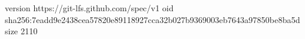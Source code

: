 version https://git-lfs.github.com/spec/v1
oid sha256:7eadd9e2438cea57820e89118927cca32b027b9369003eb7643a97850be8ba5d
size 2110
